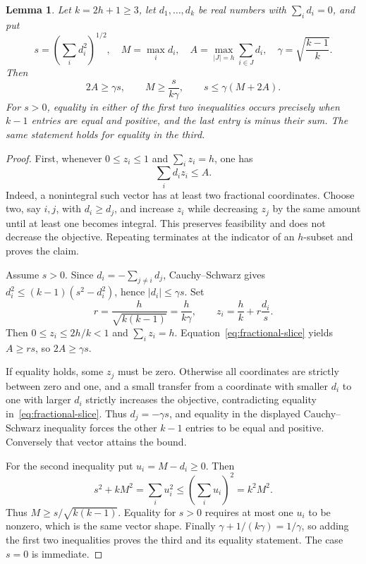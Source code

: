 \documentclass[11pt]{article}
\newtheorem{lemma}[theorem]{Lemma}
\theoremstyle{remark}\newtheorem{remark}[theorem]{Remark}
\begin{document}
\begin{lemma}\label{lem:sharp-slice-norm}
Let $k=2h+1\ge3$, let $d_1,\ldots,d_k$ be real numbers with
$\sum_i d_i=0$, and put
\[
 s=\left(\sum_i d_i^2\right)^{1/2},\quad
 M=\max_i d_i,\quad
 A=\max_{|J|=h}\sum_{i\in J}d_i,\quad
 \gamma=\sqrt{\frac{k-1}{k}}.
\]
Then
\begin{equation}\label{eq:two-slice-bounds}
 2A\ge\gamma s,\qquad M\ge\frac{s}{k\gamma},
 \qquad s\le\gamma(M+2A).
\end{equation}
For $s>0$, equality in either of the first two inequalities occurs
precisely when $k-1$ entries are equal and positive, and the last entry
is minus their sum.  The same statement holds for equality in the third.
\end{lemma}
\begin{proof}
First, whenever $0\le z_i\le1$ and $\sum_i z_i=h$, one has
\begin{equation}\label{eq:fractional-slice}
 \sum_i d_i z_i\le A.
\end{equation}
Indeed, a nonintegral such vector has at least two fractional coordinates.
Choose two, say $i,j$, with $d_i\ge d_j$, and increase $z_i$ while
decreasing $z_j$ by the same amount until at least one becomes integral.
This preserves feasibility and does not decrease the objective. Repeating
terminates at the indicator of an $h$-subset and proves the claim.

Assume $s>0$. Since $d_i=-\sum_{j\ne i}d_j$, Cauchy--Schwarz gives
$d_i^2\le(k-1)(s^2-d_i^2)$, hence $|d_i|\le\gamma s$.
Set
\[
 r=\frac{h}{\sqrt{k(k-1)}}=\frac{h}{k\gamma},
 \qquad z_i=\frac hk+r\frac{d_i}{s}.
\]
Then $0\le z_i\le2h/k<1$ and $\sum_i z_i=h$.
Equation~\eqref{eq:fractional-slice} yields
$A\ge rs$, so $2A\ge\gamma s$.

If equality holds, some $z_j$ must be zero. Otherwise all coordinates
are strictly between zero and one, and a small transfer from a coordinate
with smaller $d_i$ to one with larger $d_i$ strictly increases the
objective, contradicting equality in~\eqref{eq:fractional-slice}.
Thus $d_j=-\gamma s$, and equality in the displayed Cauchy--Schwarz
inequality forces the other $k-1$ entries to be equal and positive.
Conversely that vector attains the bound.

For the second inequality put $u_i=M-d_i\ge0$. Then
\[
 s^2+kM^2=\sum_i u_i^2\le\left(\sum_i u_i\right)^2=k^2M^2.
\]
Thus $M\ge s/\sqrt{k(k-1)}$.  Equality for $s>0$ requires at most
one $u_i$ to be nonzero, which is the same vector shape.
Finally $\gamma+1/(k\gamma)=1/\gamma$, so adding the first two
inequalities proves the third and its equality statement. The case
$s=0$ is immediate.
\end{proof}
\end{document}
